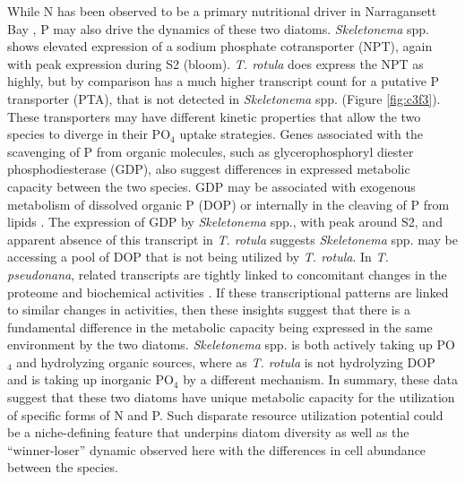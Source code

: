 While N has been observed to be a primary nutritional driver in Narragansett Bay \citep{Nixon1995,Smayda1974,Sakshaug1977}, P may also drive the dynamics of these two diatoms. \textit{Skeletonema} spp. shows elevated expression of a sodium phosphate cotransporter (NPT), again with peak expression during S2 (bloom). \textit{T. rotula} does express the NPT as highly, but by comparison has a much higher transcript count for a putative P transporter (PTA), that is not detected in \textit{Skeletonema} spp. (Figure \ref{fig:c3f3}). These transporters may have different kinetic properties that allow the two species to diverge in their PO$_4$ uptake strategies.  Genes associated with the scavenging of P from organic molecules, such as glycerophosphoryl diester phosphodiesterase (GDP), also suggest differences in expressed metabolic capacity between the two species. GDP may be associated with exogenous metabolism of dissolved organic P (DOP) or internally in the cleaving of P from lipids \citep{VanMooy2009, Dyhrman2012}. The expression of GDP by \textit{Skeletonema} spp., with peak around S2, and apparent absence of this transcript in \textit{T. rotula} suggests \textit{Skeletonema} spp. may be accessing a pool of DOP that is not being utilized by \textit{T. rotula}. In \textit{T. pseudonana}, related transcripts are tightly linked to concomitant changes in the proteome and biochemical activities \citep{Dyhrman2012}.  If these transcriptional patterns are linked to similar changes in activities, then these insights suggest that there is a fundamental difference in the metabolic capacity being expressed in the same environment by the two diatoms.  \textit{Skeletonema} spp. is both actively taking up PO$_4$ and hydrolyzing organic sources, where as \textit{T. rotula} is not hydrolyzing DOP and is taking up inorganic PO$_4$ by a different mechanism.  In summary, these data suggest that these two diatoms have unique metabolic capacity for the utilization of specific forms of N and P. Such disparate resource utilization potential could be a niche-defining feature that underpins diatom diversity as well as the ``winner-loser'' dynamic observed here with the differences in cell abundance between the species.\par
